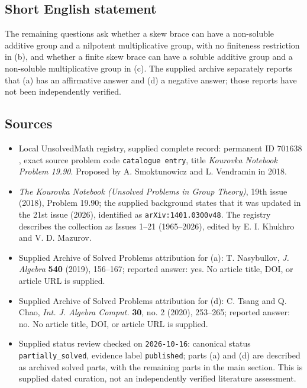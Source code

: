 \documentclass[11pt]{article}
\begin{document}
\subsection{Short English statement}
The remaining questions ask whether a skew brace can have a non-soluble additive group and a nilpotent multiplicative group, with no finiteness restriction in (b), and whether a finite skew brace can have a soluble additive group and a non-soluble multiplicative group in (c). The supplied archive separately reports that (a) has an affirmative answer and (d) a negative answer; those reports have not been independently verified.
\subsection{Sources}
\begin{itemize}
\item Local UnsolvedMath registry, supplied complete record: permanent ID \(701638\), exact source problem code \texttt{catalogue entry}, title \emph{Kourovka Notebook Problem 19.90}. Proposed by A. Smoktunowicz and L. Vendramin in 2018.
\item \emph{The Kourovka Notebook (Unsolved Problems in Group Theory)}, 19th issue (2018), Problem 19.90; the supplied background states that it was updated in the 21st issue (2026), identified as \texttt{arXiv:1401.0300v48}. The registry describes the collection as Issues 1--21 (1965--2026), edited by E. I. Khukhro and V. D. Mazurov.
\item Supplied Archive of Solved Problems attribution for (a): T. Nasybullov, \emph{J. Algebra} \textbf{540} (2019), 156--167; reported answer: yes. No article title, DOI, or article URL is supplied.
\item Supplied Archive of Solved Problems attribution for (d): C. Tsang and Q. Chao, \emph{Int. J. Algebra Comput.} \textbf{30}, no. 2 (2020), 253--265; reported answer: no. No article title, DOI, or article URL is supplied.
\item Supplied status review checked on \texttt{2026-10-16}: canonical status \texttt{partially\_solved}, evidence label \texttt{published}; parts (a) and (d) are described as archived solved parts, with the remaining parts in the main section. This is supplied dated curation, not an independently verified literature assessment.
\end{itemize}
\end{document}
